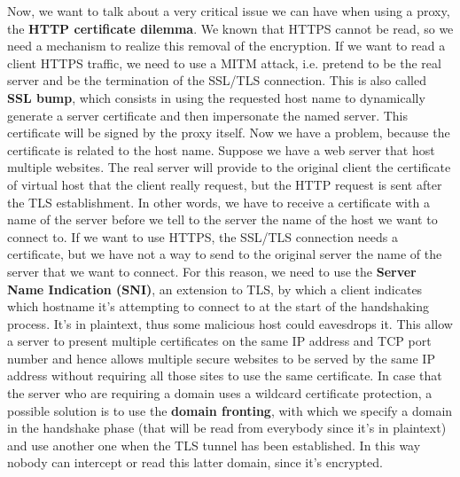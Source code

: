 \documentclass[11pt]{article}
\begin{document}
Now, we want to talk about a very critical issue we can have when using a proxy, the \textbf{HTTP certificate dilemma}. We known that HTTPS cannot be read, so we need a mechanism to realize this removal of the encryption. If we want to read a client HTTPS traffic, we need to use a MITM attack, i.e. pretend to be the real server and be the termination of the SSL/TLS connection. This is also called \textbf{SSL bump}, which consists in using the requested host name to dynamically generate a server certificate and then impersonate the named server. This certificate will be signed by the proxy itself. Now we have a problem, because the certificate is related to the host name. Suppose we have a web server that host multiple websites. The real server will provide to the original client the certificate of virtual host that the client really request, but the HTTP request is sent after the TLS establishment. In other words, we have to receive a certificate with a name of the server before we tell to the server the name of the host we want to connect to. If we want to use HTTPS, the SSL/TLS connection needs a certificate, but we have not a way to send to the original server the name of the server that we want to connect. For this reason, we need to use the \textbf{Server Name Indication (SNI)}, an extension to TLS, by which a client indicates which hostname it's attempting to connect to at the start of the handshaking process. It's in plaintext, thus some malicious host  could eavesdrops it. This allow a server to present multiple certificates on the same IP address and TCP port number and hence allows multiple secure websites to be served by the same IP address without requiring all those sites to use the same certificate. In case that the server who are requiring a domain uses a wildcard certificate protection, a possible solution is to use the \textbf{domain fronting}, with which we specify a domain in the handshake phase (that will be read from everybody since it's in plaintext) and use another one when the TLS tunnel has been established. In this way nobody can intercept or read this latter domain, since it's encrypted.
\end{document}
